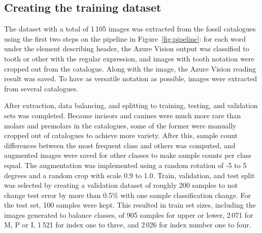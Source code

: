 \documentclass[english,twoside,openright]{UH_DS_MSc}
\begin{document}
\subsection{Creating the training dataset}

The dataset with a total of 1\,105 images was extracted from the fossil 
catalogues using the first two steps on the pipeline in Figure~\ref{fig:pipeline}:
for each word under the element describing header, the Azure Vision output was classified 
to tooth or other with the regular expression, and 
images with tooth notation were cropped out from the catalogue. Along with the image, the 
Azure Vision \cite{azurevision} reading result was saved. To have as versatile notation as possible, images were 
extracted from several catalogues.

After extraction, data balancing, and splitting to training, testing, and validation sets 
was completed.
Because incisors and canines were much more rare 
than molars and premolars in the catalogues, some of the former were manually cropped out 
of catalogues to achieve more variety. After this, sample count differences 
 between the most frequent class and others was computed, and augmented 
images were saved for other classes to make sample counts per class equal. The augmentation 
was implemented using a random rotation of -5 to 5 degrees and a random crop with scale 0.9 to 1.0.
Train, validation, and test split was selected by creating a validation dataset of roughly 200 samples to
 not change test error by more than 0.5\% with one sample classification
change. For the test set, 100 samples were kept. This resulted in 
train set sizes, including the images generated to balance classes, of 905 samples for upper or lower, 
2\,071 for M, P or I, 1\,521 for index one to three, and 2\,026 for index number one to four.
\end{document}
